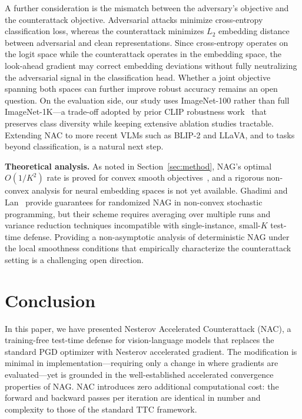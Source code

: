 \documentclass[pdflatex,sn-basic,Numbered]{sn-jnl}
\theoremstyle{thmstyleone}
\theoremstyle{thmstyletwo}
\theoremstyle{thmstylethree}
\begin{document}
A further consideration is the mismatch between the adversary's objective and the counterattack objective. Adversarial attacks minimize cross-entropy classification loss, whereas the counterattack minimizes $L_2$ embedding distance between adversarial and clean representations. Since cross-entropy operates on the logit space while the counterattack operates in the embedding space, the look-ahead gradient may correct embedding deviations without fully neutralizing the adversarial signal in the classification head. Whether a joint objective spanning both spaces can further improve robust accuracy remains an open question. On the evaluation side, our study uses ImageNet-100 rather than full ImageNet-1K---a trade-off adopted by prior CLIP robustness work~\cite{mao2023understanding,xing2025clip} that preserves class diversity while keeping extensive ablation studies tractable. Extending NAC to more recent VLMs such as BLIP-2 and LLaVA, and to tasks beyond classification, is a natural next step.

\textbf{Theoretical analysis.} As noted in Section~\ref{sec:method}, NAG's optimal $O(1/K^2)$ rate is proved for convex smooth objectives~\cite{nesterov1983method}, and a rigorous non-convex analysis for neural embedding spaces is not yet available. Ghadimi and Lan~\cite{ghadimi2016accelerated} provide guarantees for randomized NAG in non-convex stochastic programming, but their scheme requires averaging over multiple runs and variance reduction techniques incompatible with single-instance, small-$K$ test-time defense. Providing a non-asymptotic analysis of deterministic NAG under the local smoothness conditions that empirically characterize the counterattack setting is a challenging open direction.

\section{Conclusion}\label{sec:conclusion}

In this paper, we have presented Nesterov Accelerated Counterattack (NAC), a training-free test-time defense for vision-language models that replaces the standard PGD optimizer with Nesterov accelerated gradient. The modification is minimal in implementation---requiring only a change in where gradients are evaluated---yet is grounded in the well-established accelerated convergence properties of NAG. NAC introduces zero additional computational cost: the forward and backward passes per iteration are identical in number and complexity to those of the standard TTC framework.
\end{document}
